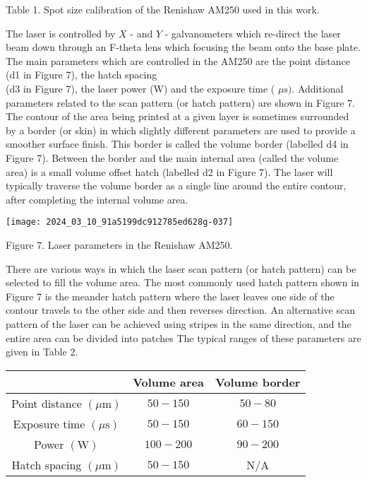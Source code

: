 \documentclass[10pt]{article}
\begin{document}
Table 1. Spot size calibration of the Renishaw AM250 used in this work.

The laser is controlled by $X$ - and $Y$ - galvanometers which re-direct the laser beam down through an F-theta lens which focusing the beam onto the base plate. The main parameters which are controlled in the AM250 are the point distance (d1 in Figure 7), the hatch spacing\\
(d3 in Figure 7), the laser power (W) and the exposure time ( $\mu \mathrm{s})$. Additional parameters related to the scan pattern (or hatch pattern) are shown in Figure 7. The contour of the area being printed at a given layer is sometimes surrounded by a border (or skin) in which slightly different parameters are used to provide a smoother surface finish. This border is called the volume border (labelled d4 in Figure 7). Between the border and the main internal area (called the volume area) is a small volume offset hatch (labelled d2 in Figure 7). The laser will typically traverse the volume border as a single line around the entire contour, after completing the internal volume area.

\begin{center}
\texttt{[image: 2024\_03\_10\_91a5199dc912785ed628g-037]}
\end{center}

Figure 7. Laser parameters in the Renishaw AM250.

There are various ways in which the laser scan pattern (or hatch pattern) can be selected to fill the volume area. The most commonly used hatch pattern shown in Figure 7 is the meander hatch pattern where the laser leaves one side of the contour travels to the other side and then reverses direction. An alternative scan pattern of the laser can be achieved using stripes in the same direction, and the entire area can be divided into patches The typical ranges of these parameters are given in Table 2.

\begin{center}
\begin{tabular}{|c|c|c|}
\hline
 & Volume area & Volume border \\
\hline
Point distance $(\mu \mathrm{m})$ & $50-150$ & $50-80$ \\
\hline
Exposure time $(\mu \mathrm{s})$ & $50-150$ & $60-150$ \\
\hline
Power $(\mathrm{W})$ & $100-200$ & $90-200$ \\
\hline
Hatch spacing $(\mu \mathrm{m})$ & $50-150$ & N/A \\
\hline
\end{tabular}
\end{center}
\end{document}
